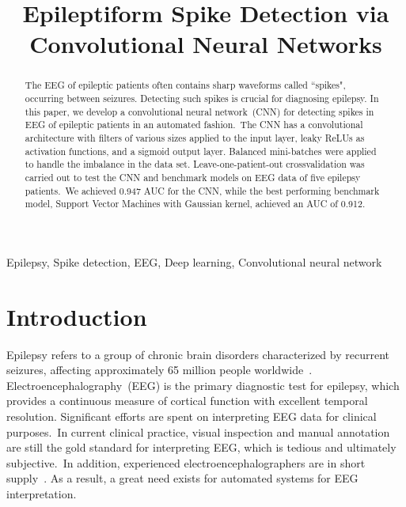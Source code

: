 \documentclass{article}
\title{Epileptiform Spike Detection via Convolutional Neural Networks}
\begin{document}
%
\maketitle
%
\begin{abstract}
The EEG of epileptic patients often contains sharp waveforms called ``spikes", occurring between seizures.
Detecting such spikes is crucial for diagnosing epilepsy.
In this paper, we develop a convolutional neural network~(CNN) for detecting spikes in EEG of epileptic patients in an automated fashion.~The CNN has a convolutional architecture with filters of various sizes applied to the input layer, leaky ReLUs as activation functions, and a sigmoid output layer.
Balanced mini-batches were applied to handle the imbalance in the data set.
Leave-one-patient-out crossvalidation was carried out to test the CNN and benchmark models on EEG data of five epilepsy patients.~We achieved 0.947 AUC for the CNN, while the best performing benchmark model, Support Vector Machines with Gaussian kernel, achieved
an AUC of 0.912.

\end{abstract}
%
\begin{keywords}
Epilepsy, Spike detection, EEG, Deep learning, Convolutional neural network
\end{keywords}
%
\section{Introduction}
\label{sec:intro}
Epilepsy refers to a group of chronic brain disorders characterized by recurrent seizures, affecting approximately 65 million people worldwide~\cite{EFA2014epilepsy}.
Electroencephalography~(EEG) is the primary diagnostic test for epilepsy, which provides a continuous measure of cortical function with excellent temporal resolution.
Significant efforts are spent on interpreting EEG data for clinical purposes.~In current clinical practice, visual inspection and manual annotation are still the gold standard for interpreting EEG, which is tedious and ultimately subjective.~In addition, experienced electroencephalographers are in short supply~\cite{racette2014supply}.
As a result, a great need exists for automated systems for EEG interpretation.\\
\end{document}
